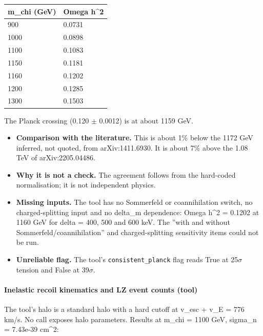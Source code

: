 \documentclass[11pt,a4paper]{article}
\begin{document}
\begin{longtable}{@{}p{}p{}@{}}
\toprule
\textbf{m\_chi (GeV)} & \textbf{Omega h\textasciicircum{}2} \\ \midrule \endhead
900 & 0.0731 \\
1000 & 0.0898 \\
1100 & 0.1083 \\
1150 & 0.1181 \\
1160 & 0.1202 \\
1200 & 0.1285 \\
1300 & 0.1503 \\
\bottomrule\end{longtable}
The Planck crossing (0.120 $\pm$ 0.0012) is at about 1159 GeV.

\begin{itemize}
  \item \textbf{Comparison with the literature.} This is about 1\% below the 1172 GeV inferred, not quoted, from arXiv:1411.6930. It is about 7\% above the 1.08 TeV of arXiv:2205.04486.
  \item \textbf{Why it is not a check.} The agreement follows from the hard-coded normalisation; it is not independent physics.
  \item \textbf{Missing inputs.} The tool has no Sommerfeld or coannihilation switch, no charged-splitting input and no delta\_m dependence: Omega h\textasciicircum{}2 = 0.1202 at 1160 GeV for delta = 400, 500 and 600 keV. The ''with and without Sommerfeld/coannihilation'' and charged-splitting sensitivity items could not be run.
  \item \textbf{Unreliable flag.} The tool's \texttt{consistent\_\allowbreak{}planck} flag reads True at 25$\sigma$ tension and False at 39$\sigma$.
\end{itemize}
\paragraph{Inelastic recoil kinematics and LZ event counts (tool)}
The tool's halo is a standard halo with a hard cutoff at v\_esc + v\_E = 776 km/s. No call exposes halo parameters. Results at m\_chi = 1100 GeV, sigma\_n = 7.43e-39 cm\textasciicircum{}2:
\end{document}
